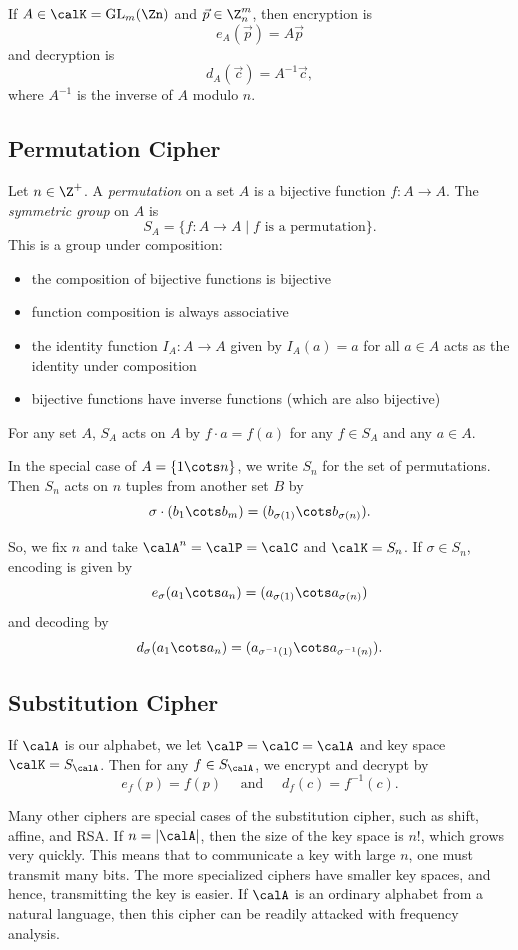 \documentclass[12pt]{amsart}
\DeclareMathOperator{\GL}{GL}
\theoremstyle{plain}
\theoremstyle{definition}
\theoremstyle{remark}
\begin{document}
If $A\in \calK=\GL_m(\Zn)$ and $\vec p \in \Z_n^m$, then encryption is
\[ e_A(\vec p) = A\vec p\]
and decryption is
\[ d_A(\vec c) = A^{-1}\vec c,\]
where $A^{-1}$ is the inverse of $A$ modulo $n$.


\subsection{Permutation Cipher}
Let $n\in\Z^+$.  A \emph{permutation} on a set $A$ is a bijective
function $f:A\to A$.  The \emph{symmetric group} on $A$ is
\[ S_A = \{ f:A\to A\mid \text{$f$ is a permutation}\}.\]
This is a group under composition:
\begin{itemize}
\item the composition of bijective functions is bijective
\item function composition is always associative
\item the identity function $I_A:A\to A$ given by $I_A(a)=a$ for all
  $a\in A$ acts as the identity under composition
\item bijective functions have inverse functions (which are also bijective)
\end{itemize}
For any set $A$, $S_A$ acts on $A$ by $f\cdot a=f(a)$ for any $f\in S_A$ and any
$a\in A$.

In the special case of $A=\{1\cots n\}$, we write $S_n$ for the set of
permutations.  Then $S_n$ acts on $n$ tuples from another set $B$ by
\[ \sigma \cdot (b_1\cots b_m) = (b_{\sigma(1)}\cots b_{\sigma(n)}).\]

So, we fix $n$ and take $\calA^n=\calP=\calC$ and $\calK=S_{n}$.  If
$\sigma\in S_n$, encoding is given by
\[ e_\sigma(a_1\cots a_n) = (a_{\sigma(1)}\cots a_{\sigma(n)})\]
and decoding by
\[ d_\sigma(a_1\cots a_n) = (a_{\sigma^{-1}(1)}\cots a_{\sigma^{-1}(n)}).\]

\subsection{Substitution Cipher}


If $\calA$ is our alphabet, we let $\calP=\calC=\calA$ and key space
$\calK=S_\calA$. 
Then for any $f\in S_\calA$, we encrypt and decrypt by
\[ e_f(p) = f(p) \quad\text{ and }\quad d_f(c) = f^{-1}(c).\]

Many other ciphers are special cases of the substitution cipher, such
as shift, affine, and RSA.  If $n=|\calA|$, then the size of the key
space is $n!$, which grows very quickly.  This means that to
communicate a key with large $n$, one must transmit many bits.  The
more specialized ciphers have smaller key spaces, and hence,
transmitting the key is easier.  If $\calA$ is an ordinary alphabet
from a natural language, then this cipher can be readily attacked with
frequency analysis.
\end{document}
